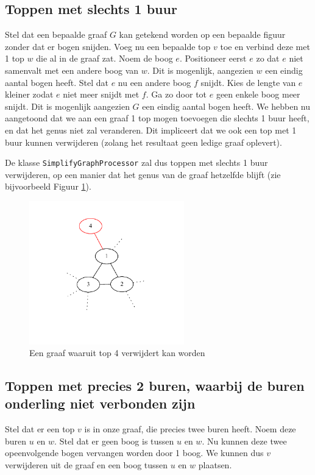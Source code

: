 \documentclass{article}
\begin{document}
\subsection{Toppen met slechts 1 buur}
\label{one-neighbour}
Stel dat een bepaalde graaf $G$ kan getekend worden op een bepaalde figuur
zonder dat er bogen snijden. Voeg nu een bepaalde top $v$ toe en verbind deze
met 1 top $w$ die al in de graaf zat. Noem de boog $e$. Positioneer eerst $e$
zo dat $e$ niet samenvalt met een andere boog van $w$. Dit is mogenlijk,
aangezien $w$ een eindig aantal bogen heeft. Stel dat $e$ nu een andere boog
$f$ snijdt. Kies de lengte van $e$ kleiner zodat $e$ niet meer snijdt met $f$.
Ga zo door tot $e$ geen enkele boog meer snijdt. Dit is mogenlijk aangezien
$G$ een eindig aantal bogen heeft. We hebben nu aangetoond dat we aan een graaf
1 top mogen toevoegen die slechts 1 buur heeft, en dat het genus niet zal
veranderen. Dit impliceert dat we ook een top met 1 buur kunnen verwijderen
(zolang het resultaat geen ledige graaf oplevert).
\newline

De klasse \verb#SimplifyGraphProcessor# zal dus toppen met slechts 1 buur
verwijderen, op een manier dat het genus van de graaf hetzelfde blijft (zie
bijvoorbeeld Figuur \ref{fig:one-neighbour}).

\begin{figure}
\begin{center}
\includegraphics[width=0.6\textwidth]{images/one-neighbour.pdf}
\caption{Een graaf waaruit top 4 verwijdert kan worden}
\label{fig:one-neighbour}
\end{center}
\end{figure}

\subsection{Toppen met precies 2 buren, waarbij de buren onderling niet
verbonden zijn}
Stel dat er een top $v$ is in onze graaf, die precies twee buren heeft. Noem
deze buren $u$ en $w$. Stel dat er geen boog is tussen $u$ en $w$. Nu kunnen
deze twee opeenvolgende bogen vervangen worden door 1 boog. We kunnen dus
$v$ verwijderen uit de graaf en een boog tussen $u$ en $w$ plaatsen.
\newline
\end{document}
